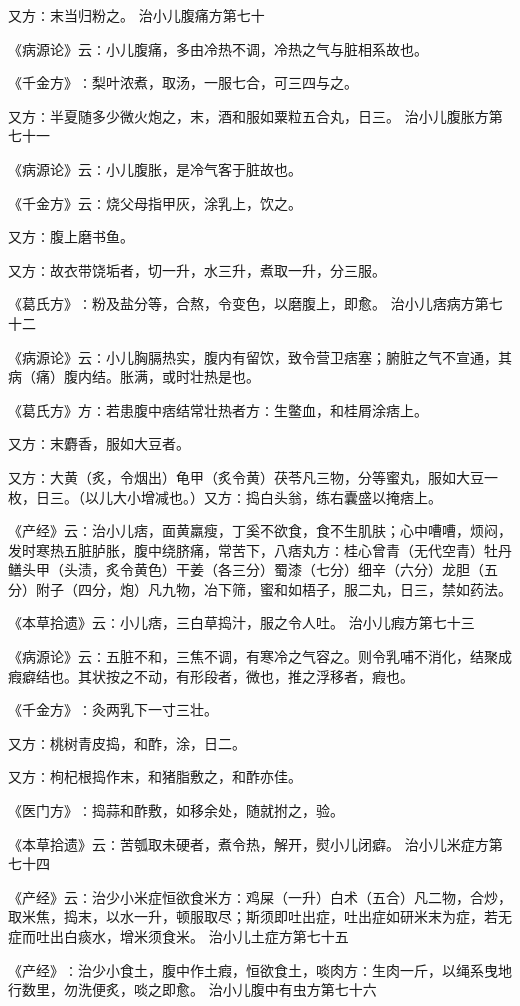 \documentclass[a4paper,12pt,UTF8,twoside]{ctexbook}
\begin{document}
又方∶末当归粉之。
治小儿腹痛方第七十

《病源论》云∶小儿腹痛，多由冷热不调，冷热之气与脏相系故也。

《千金方》∶梨叶浓煮，取汤，一服七合，可三四与之。

又方∶半夏随多少微火炮之，末，酒和服如粟粒五合丸，日三。
治小儿腹胀方第七十一

《病源论》云∶小儿腹胀，是冷气客于脏故也。

《千金方》云∶烧父母指甲灰，涂乳上，饮之。

又方∶腹上磨书鱼。

又方∶故衣带饶垢者，切一升，水三升，煮取一升，分三服。

《葛氏方》∶粉及盐分等，合熬，令变色，以磨腹上，即愈。
治小儿痞病方第七十二

《病源论》云∶小儿胸膈热实，腹内有留饮，致令营卫痞塞；腑脏之气不宣通，其病（痛）腹内结。胀满，或时壮热是也。

《葛氏方》方∶若患腹中痞结常壮热者方∶生鳖血，和桂屑涂痞上。

又方∶末麝香，服如大豆者。

又方∶大黄（炙，令烟出）龟甲（炙令黄）茯苓凡三物，分等蜜丸，服如大豆一枚，日三。（以儿大小增减也。）又方∶捣白头翁，练右囊盛以掩痞上。

《产经》云∶治小儿痞，面黄羸瘦，丁奚不欲食，食不生肌肤；心中嘈嘈，烦闷，发时寒热五脏胪胀，腹中绕脐痛，常苦下，八痞丸方∶桂心曾青（无代空青）牡丹鳝头甲（头渍，炙令黄色）干姜（各三分）蜀漆（七分）细辛（六分）龙胆（五分）附子（四分，炮）凡九物，冶下筛，蜜和如梧子，服二丸，日三，禁如药法。

《本草拾遗》云∶小儿痞，三白草捣汁，服之令人吐。
治小儿瘕方第七十三

《病源论》云∶五脏不和，三焦不调，有寒冷之气容之。则令乳哺不消化，结聚成瘕癖结也。其状按之不动，有形段者，微也，推之浮移者，瘕也。

《千金方》∶灸两乳下一寸三壮。

又方∶桃树青皮捣，和酢，涂，日二。

又方∶枸杞根捣作末，和猪脂敷之，和酢亦佳。

《医门方》∶捣蒜和酢敷，如移余处，随就拊之，验。

《本草拾遗》云∶苦瓠取未硬者，煮令热，解开，熨小儿闭癖。
治小儿米症方第七十四

《产经》云∶治少小米症恒欲食米方∶鸡屎（一升）白术（五合）凡二物，合炒，取米焦，捣末，以水一升，顿服取尽；斯须即吐出症，吐出症如研米末为症，若无症而吐出白痰水，增米须食米。
治小儿土症方第七十五

《产经》∶治少小食土，腹中作土瘕，恒欲食土，啖肉方∶生肉一斤，以绳系曳地行数里，勿洗便炙，啖之即愈。
治小儿腹中有虫方第七十六
\end{document}
